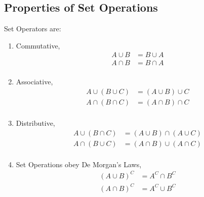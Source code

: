 \subsection{Properties of Set Operations}\label{subsec:Properties of Set Ops}
Set Operators are:
\begin{enumerate}
\item Commutative, 
  \begin{equation} %
    \begin{aligned}
      A \cup B &= B \cup A \\
      A \cap B &= B \cap A \\
    \end{aligned}
   \label{eq:Set Ops-Commutative}
  \end{equation}

\item Associative,
  \begin{equation} %
    \begin{aligned}
      A \cup \left( B \cup C \right) &= \left( A \cup B \right) \cup C \\
      A \cap \left( B \cap C \right) &= \left( A \cap B \right) \cap C \\
    \end{aligned}
   \label{eq:Set Ops-Associative}
  \end{equation}

\item Distributive, 
  \begin{equation} %
    \begin{aligned}
      A \cup \left( B \cap C \right) &= \left( A \cup B \right) \cap \left( A \cup C \right) \\
      A \cap \left( B \cup C \right) &= \left( A \cap B \right) \cup \left( A \cap C \right) \\
    \end{aligned}
   \label{eq:Set Ops-Distributive}
  \end{equation}

\item Set Operations obey De Morgan's Laws, 
  \begin{equation} %
    \begin{aligned}
      \left( A \cup B \right)^{C} &= A^{C} \cap B^{C} \\
      \left( A \cap B \right)^{C} &= A^{C} \cup B^{C} \\
    \end{aligned}
   \label{eq:Set Ops-De Morgan's}
  \end{equation}

\end{enumerate}
